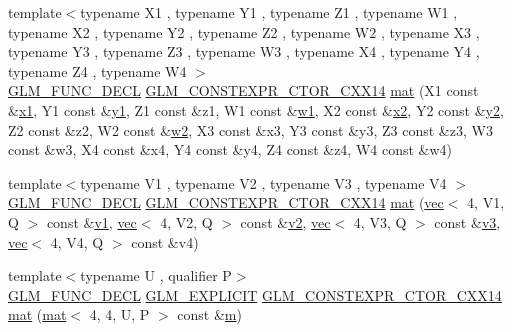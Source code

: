 \begin{DoxyCompactItemize}
\item 
{\footnotesize template$<$typename X1 , typename Y1 , typename Z1 , typename W1 , typename X2 , typename Y2 , typename Z2 , typename W2 , typename X3 , typename Y3 , typename Z3 , typename W3 , typename X4 , typename Y4 , typename Z4 , typename W4 $>$ }\\\mbox{\hyperlink{setup_8hpp_ab2d052de21a70539923e9bcbf6e83a51}{G\+L\+M\+\_\+\+F\+U\+N\+C\+\_\+\+D\+E\+CL}} \mbox{\hyperlink{setup_8hpp_a0900f9145e68bf6061b6f5e7be3fa751}{G\+L\+M\+\_\+\+C\+O\+N\+S\+T\+E\+X\+P\+R\+\_\+\+C\+T\+O\+R\+\_\+\+C\+X\+X14}} \mbox{\hyperlink{structglm_1_1mat_3_014_00_014_00_01_t_00_01_q_01_4_a17ec7d9bde054dde9908c44c56eccf95}{mat}} (X1 const \&\mbox{\hyperlink{_s_d_l__opengl__glext_8h_a49825216c96caaeb09237b36651181c5}{x1}}, Y1 const \&\mbox{\hyperlink{_s_d_l__opengl__glext_8h_a3af6c78fcdfccea028a5878bc747ef39}{y1}}, Z1 const \&z1, W1 const \&\mbox{\hyperlink{_s_d_l__opengl__glext_8h_ab5b747bf5adb1f9134337c30b9a4ce84}{w1}}, X2 const \&\mbox{\hyperlink{_s_d_l__opengl__glext_8h_a7b907a03236685c534d89d604cff23c8}{x2}}, Y2 const \&\mbox{\hyperlink{_s_d_l__opengl__glext_8h_a2be1135ed68e8d80fa9e130c7814f8c2}{y2}}, Z2 const \&z2, W2 const \&\mbox{\hyperlink{_s_d_l__opengl__glext_8h_a1ca5aca787be24213d9591fdf074b094}{w2}}, X3 const \&x3, Y3 const \&y3, Z3 const \&z3, W3 const \&w3, X4 const \&x4, Y4 const \&y4, Z4 const \&z4, W4 const \&w4)
\item 
{\footnotesize template$<$typename V1 , typename V2 , typename V3 , typename V4 $>$ }\\\mbox{\hyperlink{setup_8hpp_ab2d052de21a70539923e9bcbf6e83a51}{G\+L\+M\+\_\+\+F\+U\+N\+C\+\_\+\+D\+E\+CL}} \mbox{\hyperlink{setup_8hpp_a0900f9145e68bf6061b6f5e7be3fa751}{G\+L\+M\+\_\+\+C\+O\+N\+S\+T\+E\+X\+P\+R\+\_\+\+C\+T\+O\+R\+\_\+\+C\+X\+X14}} \mbox{\hyperlink{structglm_1_1mat_3_014_00_014_00_01_t_00_01_q_01_4_a5321c85fc84ae012f0f05976555d00b0}{mat}} (\mbox{\hyperlink{structglm_1_1vec}{vec}}$<$ 4, V1, Q $>$ const \&\mbox{\hyperlink{_s_d_l__opengl__glext_8h_a435c176a02c061b43e19bdf7c86cceae}{v1}}, \mbox{\hyperlink{structglm_1_1vec}{vec}}$<$ 4, V2, Q $>$ const \&\mbox{\hyperlink{_s_d_l__opengl__glext_8h_a0928f6d0f0f794ba000a21dfae422136}{v2}}, \mbox{\hyperlink{structglm_1_1vec}{vec}}$<$ 4, V3, Q $>$ const \&\mbox{\hyperlink{_s_d_l__opengl__glext_8h_acc806b31cbf466ceba6555983d8b814d}{v3}}, \mbox{\hyperlink{structglm_1_1vec}{vec}}$<$ 4, V4, Q $>$ const \&v4)
\item 
{\footnotesize template$<$typename U , qualifier P$>$ }\\\mbox{\hyperlink{setup_8hpp_ab2d052de21a70539923e9bcbf6e83a51}{G\+L\+M\+\_\+\+F\+U\+N\+C\+\_\+\+D\+E\+CL}} \mbox{\hyperlink{setup_8hpp_a6c74f5a5e7b134ab69023ff9a30d4d5d}{G\+L\+M\+\_\+\+E\+X\+P\+L\+I\+C\+IT}} \mbox{\hyperlink{setup_8hpp_a0900f9145e68bf6061b6f5e7be3fa751}{G\+L\+M\+\_\+\+C\+O\+N\+S\+T\+E\+X\+P\+R\+\_\+\+C\+T\+O\+R\+\_\+\+C\+X\+X14}} \mbox{\hyperlink{structglm_1_1mat_3_014_00_014_00_01_t_00_01_q_01_4_a72a3e030050c4da5ee1d208726898e70}{mat}} (\mbox{\hyperlink{structglm_1_1mat}{mat}}$<$ 4, 4, U, P $>$ const \&\mbox{\hyperlink{_s_d_l__opengl__glext_8h_af593500c283bf1a787a6f947f503a5c2}{m}})

\end{DoxyCompactItemize}
